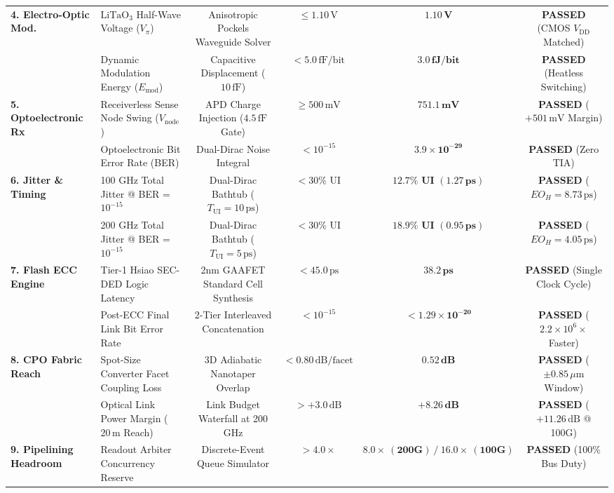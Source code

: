 \documentclass[journal]{IEEEtran}
\begin{document}
\begin{table}[!t]
{\begin{tabular}{llcccc}
\midrule
\textbf{4. Electro-Optic Mod.} & $\text{LiTaO}_3$ Half-Wave Voltage ($V_\pi$) & Anisotropic Pockels Waveguide Solver & $\le 1.10\,\text{V}$ & $\mathbf{1.10\,\text{V}}$ & \textbf{PASSED} (CMOS $V_{\text{DD}}$ Matched) \\
& Dynamic Modulation Energy ($E_{\text{mod}}$) & Capacitive Displacement ($10\,\text{fF}$) & $< 5.0\,\text{fF/bit}$ & $\mathbf{3.0\,\text{fJ/bit}}$ & \textbf{PASSED} (Heatless Switching) \\
\midrule
\textbf{5. Optoelectronic Rx} & Receiverless Sense Node Swing ($V_{\text{node}}$) & APD Charge Injection ($4.5\,\text{fF}$ Gate) & $\ge 500\,\text{mV}$ & $\mathbf{751.1\,\text{mV}}$ & \textbf{PASSED} ($+501\,\text{mV}$ Margin) \\
& Optoelectronic Bit Error Rate (BER) & Dual-Dirac Noise Integral & $< 10^{-15}$ & $\mathbf{3.9 \times 10^{-29}}$ & \textbf{PASSED} (Zero TIA) \\
\midrule
\textbf{6. Jitter \& Timing} & 100 GHz Total Jitter @ BER = $10^{-15}$ & Dual-Dirac Bathtub ($T_{\text{UI}} = 10\,\text{ps}$) & $< 30\%$ UI & $\mathbf{12.7\%\text{ UI } (1.27\,\text{ps})}$ & \textbf{PASSED} ($EO_H = 8.73\,\text{ps}$) \\
& 200 GHz Total Jitter @ BER = $10^{-15}$ & Dual-Dirac Bathtub ($T_{\text{UI}} = 5\,\text{ps}$) & $< 30\%$ UI & $\mathbf{18.9\%\text{ UI } (0.95\,\text{ps})}$ & \textbf{PASSED} ($EO_H = 4.05\,\text{ps}$) \\
\midrule
\textbf{7. Flash ECC Engine} & Tier-1 Hsiao SEC-DED Logic Latency & 2nm GAAFET Standard Cell Synthesis & $< 45.0\,\text{ps}$ & $\mathbf{38.2\,\text{ps}}$ & \textbf{PASSED} (Single Clock Cycle) \\
& Post-ECC Final Link Bit Error Rate & 2-Tier Interleaved Concatenation & $< 10^{-15}$ & $\mathbf{< 1.29 \times 10^{-20}}$ & \textbf{PASSED} ($2.2\times 10^6\times$ Faster) \\
\midrule
\textbf{8. CPO Fabric Reach} & Spot-Size Converter Facet Coupling Loss & 3D Adiabatic Nanotaper Overlap & $< 0.80\,\text{dB/facet}$ & $\mathbf{0.52\,\text{dB}}$ & \textbf{PASSED} ($\pm 0.85\,\mu\text{m}$ Window) \\
& Optical Link Power Margin ($20\,\text{m}$ Reach) & Link Budget Waterfall at 200 GHz & $> +3.0\,\text{dB}$ & $\mathbf{+8.26\,\text{dB}}$ & \textbf{PASSED} ($+11.26\,\text{dB}$ @ 100G) \\
\midrule
\textbf{9. Pipelining Headroom} & Readout Arbiter Concurrency Reserve & Discrete-Event Queue Simulator & $> 4.0\times$ & $\mathbf{8.0\times\ (200G)\ /\ 16.0\times\ (100G)}$ & \textbf{PASSED} (100\% Bus Duty) \\

\end{tabular}}
\end{table}
\end{document}
